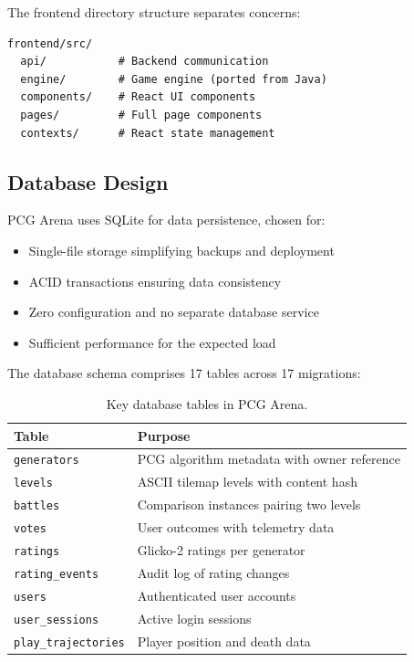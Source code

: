 \documentclass[11pt,a4paper]{article}
\theoremstyle{plain}
\theoremstyle{definition}
\theoremstyle{remark}
\begin{document}
The frontend directory structure separates concerns:

\begin{lstlisting}
frontend/src/
  api/           # Backend communication
  engine/        # Game engine (ported from Java)
  components/    # React UI components
  pages/         # Full page components
  contexts/      # React state management
\end{lstlisting}

\subsection{Database Design}
\label{subsec:database}

PCG Arena uses SQLite for data persistence, chosen for:

\begin{itemize}
    \item Single-file storage simplifying backups and deployment
    \item ACID transactions ensuring data consistency
    \item Zero configuration and no separate database service
    \item Sufficient performance for the expected load
\end{itemize}

The database schema comprises 17 tables across 17 migrations:

\begin{table}[H]
\centering
\begin{tabular}{ll}
\toprule
\textbf{Table} & \textbf{Purpose} \\
\midrule
\texttt{generators} & PCG algorithm metadata with owner reference \\
\texttt{levels} & ASCII tilemap levels with content hash \\
\texttt{battles} & Comparison instances pairing two levels \\
\texttt{votes} & User outcomes with telemetry data \\
\texttt{ratings} & Glicko-2 ratings per generator \\
\texttt{rating\_events} & Audit log of rating changes \\
\texttt{users} & Authenticated user accounts \\
\texttt{user\_sessions} & Active login sessions \\
\texttt{play\_trajectories} & Player position and death data \\
\bottomrule
\end{tabular}
\caption{Key database tables in PCG Arena.}
\label{tab:db-tables}
\end{table}
\end{document}
